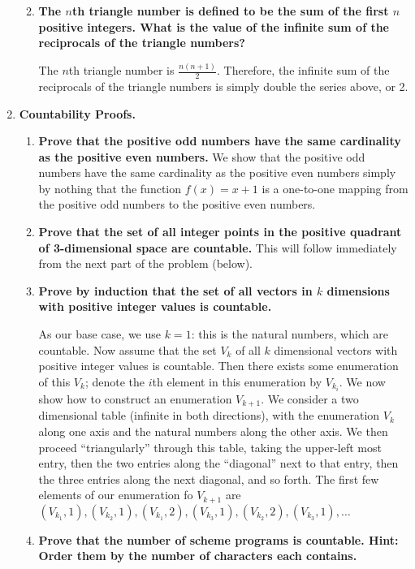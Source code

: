\documentclass[12pt]{amsart}
\begin{document}
\begin{enumerate}
\begin{enumerate}
\medskip

\item {\bf The $n$th triangle number is defined to be the sum of the first $n$ positive integers.  What is the value of the infinite sum of the reciprocals of the triangle numbers?}

The $n$th triangle number is $\frac{n(n+1)}{2}$.  Therefore, the
infinite sum of the reciprocals of the triangle numbers is simply
double the series above, or 2.

\end{enumerate}

\medskip

\item {\bf Countability Proofs.}
\begin{enumerate}
\item {\bf Prove that the positive odd numbers have the same cardinality as the positive even numbers.}
We show that the positive odd numbers have the same cardinality as the positive even numbers simply by nothing that the function $f(x) = x+1$ is a one-to-one mapping from the positive odd numbers to the positive even numbers.

\item {\bf Prove that the set of all integer points in the positive quadrant of 3-dimensional space are countable.}
This will follow immediately from the next part of the problem (below).


\item {\bf Prove by induction that the set of all vectors in $k$ dimensions with positive integer values is countable.}

As our base case, we use $k = 1$: this is the natural numbers, which
are countable.  Now assume that the set $V_k$ of all $k$ dimensional
vectors with positive integer values is countable.  Then there exists
some enumeration of this $V_k$; denote the $i$th element in this
enumeration by $V_{k_i}$.  We now show how to construct an enumeration
$V_{k+1}$.  We consider a two dimensional table (infinite in both
directions), with the enumeration $V_k$ along one axis and the natural
numbers along the other axis.  We then proceed ``triangularly''
through this table, taking the upper-left most entry, then the two
entries along the ``diagonal'' next to that entry, then the three
entries along the next diagonal, and so forth.  The first few elements
of our enumeration fo $V_{k+1}$ are $(V_{k_1}, 1), (V_{k_2}, 1),
(V_{k_1}, 2), (V_{k_3}, 1), (V_{k_2}, 2), (V_{k_3}, 1), \ldots$


\item {\bf Prove that the number of scheme programs is countable.  Hint: Order them by the number of characters each contains.}


\end{enumerate}
\end{enumerate}
\end{document}
